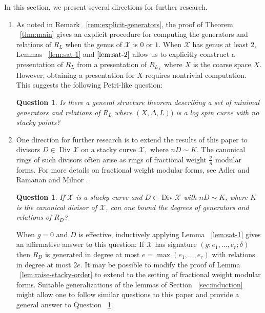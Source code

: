 \documentclass{amsart}
\theoremstyle{plain}
\newtheorem{question}[thm]{Question}
\theoremstyle{definition}
\theoremstyle{remark}
\numberwithin{equation}{section}
\DeclareMathOperator\di{Div}
\newcommand\sx{\mathscr X}
\newcommand{\halfcan}{L}
\begin{document}
In this section, we present several directions for further research.
\begin{enumerate}
	\item As noted in Remark ~\ref{rem:explicit-generators}, the 
		proof of Theorem ~\ref{thm:main} 
		gives an 
		explicit procedure for computing the generators and relations of $R_
		\halfcan$ when the genus of $\sx$ is $0$ or $1$.  When $\sx$ has genus at least 2, Lemmas ~\ref{lem:sat-1} and $\ref{lem:sat-2}$ allow us to explicitly construct a presentation of $R_\halfcan$ from a presentation of $R_{L_X}$ where $X$ is the coarse space $X$.  However, obtaining a presentation for $X$ requires nontrivial computation.  This suggests the following Petri-like question:
		\begin{question}
		\label{ques:spin-canonical-petri}
			Is there a general structure theorem describing a set of minimal 
			generators and relations of $R_{\halfcan}$ where $(X, \Delta, L))$ is a log spin curve with no stacky points?
		\end{question}
		
\item One direction for further research is to 
		extend the results of this paper to divisors $D \in \di \sx$ on a 
		stacky curve $\sx,$ where $nD \sim K.$ The canonical rings of such 
		divisors often arise as rings of fractional weight $\frac{2}{n}$ modular
		forms. For more details on fractional weight modular forms, see Adler and Ramanan \cite[p. 96]{adler:moduli} and Milnor \cite
		[$\mathsection$ 6]{milnor:fractional-weight}.

\begin{question}
		\label{ques:fractional-weight}
			If $\sx$ is a stacky curve and $D \in \di \sx$ with $nD \sim K$, 
			where $K$ is the canonical divisor of $\sx$, can one bound the 
			degrees of generators and relations of $R_D$?
		\end{question}
		When $g=0$ and $D$ is effective, inductively applying Lemma ~\ref{lem:sat-1}  
		gives an affirmative answer to this question: If $\sx$ has signature 
		$(g; e_1, \ldots, e_r; \delta)$ then $R_D$ is generated in degree at 
		most $e = \max(e_1, \ldots, e_r)$ with relations in degree at most
		$2e$. 
		It may be possible to modify the proof of Lemma
		~\ref{lem:raise-stacky-order} to extend to the setting of fractional 
		weight modular forms. 
		Suitable generalizations of the 
		lemmas of Section ~\ref{sec:induction} might allow one to 
		follow similar questions to this paper and provide a general 
		answer to Question ~\ref{ques:fractional-weight}.



\end{enumerate}
\end{document}
